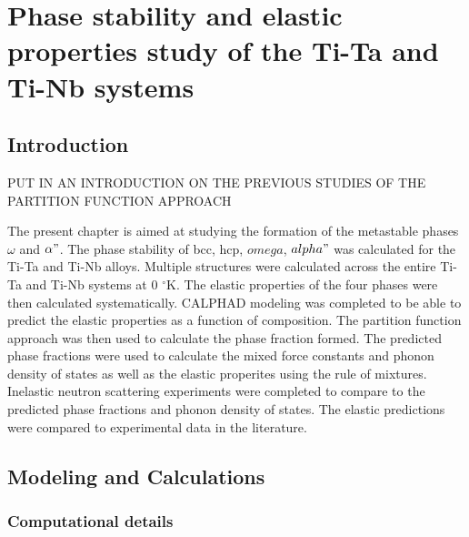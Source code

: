 \chapter{Phase stability and elastic properties study of the Ti-Ta and Ti-Nb systems}

\section{Introduction}

PUT IN AN INTRODUCTION ON THE PREVIOUS STUDIES OF THE PARTITION FUNCTION APPROACH

The present chapter is aimed at studying the formation of the metastable phases $\omega$ and $\alpha"$. The phase stability of bcc, hcp, $omega$, $alpha"$ was calculated for the Ti-Ta and Ti-Nb alloys. Multiple structures were calculated across the entire Ti-Ta and Ti-Nb systems at 0 $^\circ$K. The elastic properties of the four phases were then calculated systematically. CALPHAD modeling was completed to be able to predict the elastic properties as a function of composition. The partition function approach was then used to calculate the phase fraction formed. The predicted phase fractions were used to calculate the mixed force constants and phonon density of states as well as the elastic properites using the rule of mixtures. Inelastic neutron scattering experiments were completed to compare to the predicted phase fractions and phonon density of states. The elastic predictions were compared to experimental data in the literature. 

\section{Modeling and Calculations}

\subsection{Computational details}

